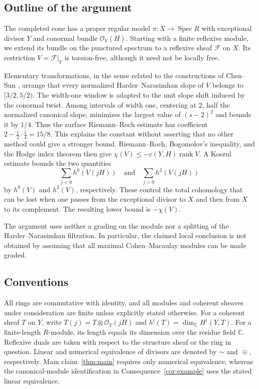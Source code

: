\documentclass[11pt,reqno]{amsart}
\numberwithin{equation}{section}
\theoremstyle{definition}
\theoremstyle{remark}
\newcommand{\C}{\mathbb C}
\newcommand{\OO}{\mathcal O}
\newcommand{\FF}{\mathcal F}
\newcommand{\rk}{\operatorname{rank}}
\newcommand{\Spec}{\operatorname{Spec}}
\begin{document}
\subsection*{Outline of the argument}
The completed cone has a proper regular model $\pi:X\to\Spec R$ with
exceptional divisor $Y$ and conormal bundle $\OO_Y(H)$. Starting with a
finite reflexive module, we extend its bundle on the punctured spectrum
to a reflexive sheaf $\FF$ on $X$. Its restriction $V=\FF|_Y$ is
torsion-free, although it need not be locally free.

Elementary transformations, in the sense related to the constructions
of Chen--Sun \cite{ChenSun2020}, arrange that every normalized
Harder--Narasimhan slope of $V$ belongs to $[3/2,5/2)$. The width-one
window is adapted to the unit slope shift induced by the conormal twist.
Among intervals of width one, centering at $2$, half the normalized
canonical slope, minimizes the largest value of $(s-2)^2$ and bounds it
by $1/4$. Thus the surface Riemann--Roch estimate has coefficient
$2-\tfrac12\cdot\tfrac14=15/8$. This explains the constant without
asserting that no other method could give a stronger bound.
Riemann--Roch, Bogomolov's inequality, and the Hodge index theorem then
give $\chi(V)\leq-c(Y,H)\rk V$. A Koszul estimate bounds the two quantities
\[
 \sum_{j<0}h^0(V(jH))\quad\text{and}\quad
 \sum_{j>0}h^2(V(jH))
\]
by $h^0(V)$ and $h^2(V)$, respectively. These control the total cohomology
that can be lost when one passes from the exceptional divisor to $X$ and
then from $X$ to its complement. The resulting lower bound is
$-\chi(V)$.

The argument uses neither a grading on the module nor a splitting of
the Harder--Narasimhan filtration. In particular, the claimed local
conclusion is not obtained by assuming that all maximal Cohen--Macaulay
modules can be made graded.

\subsection*{Conventions}
All rings are commutative with identity, and all modules and coherent
sheaves under consideration are finite unless explicitly stated
otherwise. For a coherent sheaf $T$ on $Y$, write
$T(j)=T\otimes\OO_Y(jH)$ and $h^i(T)=\dim_\C H^i(Y,T)$.
For a finite-length $R$-module, its length equals its dimension over the
residue field $\C$. Reflexive duals are taken with respect to the
structure sheaf or the ring in question. Linear and numerical equivalence
of divisors are denoted by $\sim$ and $\equiv$, respectively.
Main claim~\ref{thm:main} requires only numerical equivalence, whereas
the canonical-module identification in Consequence~\ref{cor:example}
uses the stated linear equivalence.
\end{document}
